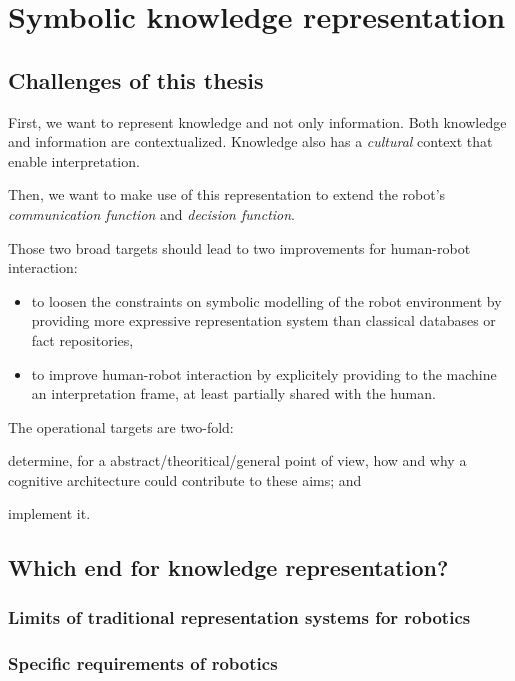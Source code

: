 \chapter{Symbolic knowledge representation}

\section{Challenges of this thesis}
\label{sect|krs-challenges}

First, we want to represent knowledge and not only information.  Both knowledge and information are contextualized. Knowledge also has a \emph{cultural} context that enable interpretation. 

Then, we want to make use of this representation to extend the robot's \emph{communication function} and \emph{decision function}.

Those two broad targets should lead to two improvements for human-robot interaction:
\begin{itemize}
	\item to loosen the constraints on symbolic modelling of the robot environment by providing more expressive representation system than classical databases or fact repositories,
	\item to improve human-robot interaction by explicitely providing to the machine an interpretation frame, at least partially shared with the human.
\end{itemize}

The operational targets are two-fold:
\begin{inparaenum}
\item determine, for a abstract/theoritical/general point of view, how and why a cognitive architecture could contribute to these aims; and
\item implement it.
\end{inparaenum}

\section{Which end for knowledge representation?}
\label{sect|krs-purpose}

\subsection{Limits of traditional representation systems for robotics}
\label{subssect|limits}

\subsection{Specific requirements of robotics}
\label{subssect|robotics-specifics}

